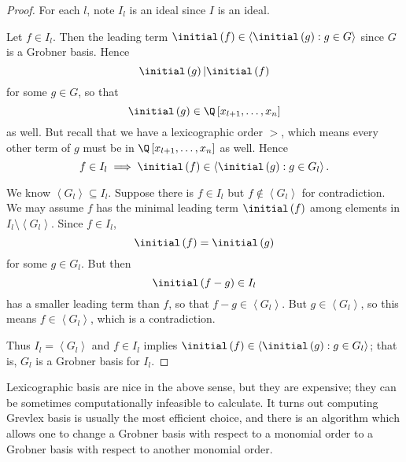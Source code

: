 \documentclass[co439]{subfiles}
\begin{document}
    \begin{proof}
        For each $l$, note $I_l$ is an ideal since $I$ is an ideal.

        Let $f\in I_l$. Then the leading term $\initial\left( f \right)\in \left< \initial\left( g \right):g\in G \right>$ since $G$ is a Grobner basis. Hence
        \begin{equation*}
            \initial\left( g \right) | \initial\left( f \right)
        \end{equation*}
        for some $g\in G$, so that
        \begin{equation*}
            \initial\left( g \right)\in \Q\left[ x_{l+1},\ldots,x_n \right]
        \end{equation*}
        as well. But recall that we have a lexicographic order $>$, which means every other term of $g$ must be in $\Q\left[ x_{l+1},\ldots,x_n \right]$ as well. Hence
        \begin{equation*}
            f\in I_l \implies \initial\left( f \right)\in \left< \initial\left( g \right):g\in G_l \right> .
        \end{equation*}

        We know $\left< G_l \right>\subseteq I_l$. Suppose there is $f\in I_l$ but $f\notin \left< G_l \right>$ for contradiction. We may assume $f$ has the minimal leading term $\initial\left( f \right)$ among elements in $I_l\setminus\left< G_l \right>$. Since $f\in I_l$,
        \begin{equation*}
            \initial\left( f \right) = \initial\left( g \right)
        \end{equation*}
        for some $g\in G_l$. But then
        \begin{equation*}
            \initial\left( f-g \right) \in I_l
        \end{equation*}
        has a smaller leading term than $f$, so that $f-g\in \left< G_l \right>$. But $g\in \left< G_l \right>$, so this means $f\in\left< G_l \right>$, which is a contradiction.

        Thus $I_l=\left< G_l \right>$ and $f\in I_l$ implies $\initial\left( f \right) \in \left< \initial\left( g \right): g\in G_l \right>$; that is, $G_l$ is a Grobner basis for $I_l$.  
    \end{proof}

    \np Lexicographic basis are nice in the above sense, but they are expensive; they can be sometimes computationally infeasible to calculate. It turns out computing Grevlex basis is usually the most efficient choice, and there is an algorithm which allows one to change a Grobner basis with respect to a monomial order to a Grobner basis with respect to another monomial order.
\end{document}
